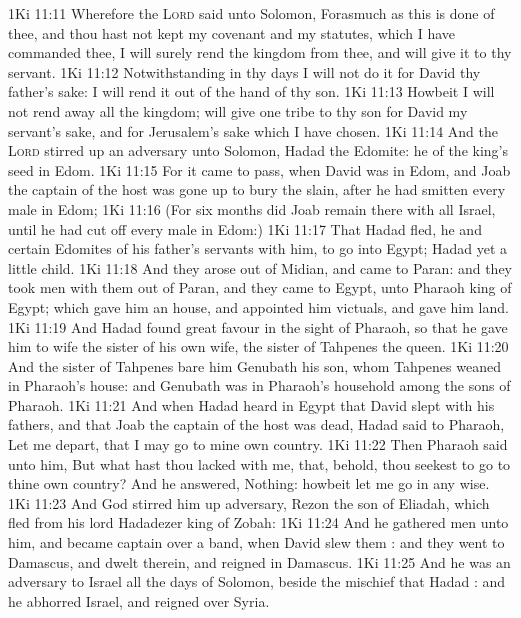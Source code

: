 \vs 1Ki 11:11 Wherefore the \textsc{Lord} said unto Solomon, Forasmuch as this is done of thee, and thou hast not kept my covenant and my statutes, which I have commanded thee, I will surely rend the kingdom from thee, and will give it to thy servant.
\vs 1Ki 11:12 Notwithstanding in thy days I will not do it for David thy father's sake:  I will rend it out of the hand of thy son.
\vs 1Ki 11:13 Howbeit I will not rend away all the kingdom;  will give one tribe to thy son for David my servant's sake, and for Jerusalem's sake which I have chosen.
\vs 1Ki 11:14 And the \textsc{Lord} stirred up an adversary unto Solomon, Hadad the Edomite: he  of the king's seed in Edom.
\vs 1Ki 11:15 For it came to pass, when David was in Edom, and Joab the captain of the host was gone up to bury the slain, after he had smitten every male in Edom;
\vs 1Ki 11:16 (For six months did Joab remain there with all Israel, until he had cut off every male in Edom:)
\vs 1Ki 11:17 That Hadad fled, he and certain Edomites of his father's servants with him, to go into Egypt; Hadad  yet a little child.
\vs 1Ki 11:18 And they arose out of Midian, and came to Paran: and they took men with them out of Paran, and they came to Egypt, unto Pharaoh king of Egypt; which gave him an house, and appointed him victuals, and gave him land.
\vs 1Ki 11:19 And Hadad found great favour in the sight of Pharaoh, so that he gave him to wife the sister of his own wife, the sister of Tahpenes the queen.
\vs 1Ki 11:20 And the sister of Tahpenes bare him Genubath his son, whom Tahpenes weaned in Pharaoh's house: and Genubath was in Pharaoh's household among the sons of Pharaoh.
\vs 1Ki 11:21 And when Hadad heard in Egypt that David slept with his fathers, and that Joab the captain of the host was dead, Hadad said to Pharaoh, Let me depart, that I may go to mine own country.
\vs 1Ki 11:22 Then Pharaoh said unto him, But what hast thou lacked with me, that, behold, thou seekest to go to thine own country? And he answered, Nothing: howbeit let me go in any wise.
\vs 1Ki 11:23 And God stirred him up  adversary, Rezon the son of Eliadah, which fled from his lord Hadadezer king of Zobah:
\vs 1Ki 11:24 And he gathered men unto him, and became captain over a band, when David slew them : and they went to Damascus, and dwelt therein, and reigned in Damascus.
\vs 1Ki 11:25 And he was an adversary to Israel all the days of Solomon, beside the mischief that Hadad : and he abhorred Israel, and reigned over Syria.
